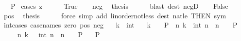 \begin{isabellebody}
\ \ \ P\isanewline
%
\isadelimproof
%
\endisadelimproof
%
\isatagproof
{}\isamarkupfalse%
\ {\isacharparenleft}{\kern0pt}cases\ {\isachardoublequoteopen}z\ {\isacharless}{\kern0pt}\ {}{\isachardoublequoteclose}{\isacharparenright}{\kern0pt}\isanewline
\ \ \isamarkupfalse%
\ True\isanewline
\ \ \isamarkupfalse%
\ neg\ \isamarkupfalse%
\ {\isacharquery}{\kern0pt}thesis\isanewline
\ \ \ \ \isamarkupfalse%
\ {\isacharparenleft}{\kern0pt}blast\ dest{\isacharbang}{\kern0pt}{\isacharcolon}{\kern0pt}\ negD{\isacharparenright}{\kern0pt}\isanewline
{}\isamarkupfalse%
\isanewline
\ \ \isamarkupfalse%
\ False\isanewline
\ \ \isamarkupfalse%
\ pos\ \isamarkupfalse%
\ {\isacharquery}{\kern0pt}thesis\isanewline
\ \ \ \ \isamarkupfalse%
\ {\isacharparenleft}{\kern0pt}force\ simp\ add{\isacharcolon}{\kern0pt}\ linorder{\isacharunderscore}{\kern0pt}not{\isacharunderscore}{\kern0pt}less\ dest{\isacharcolon}{\kern0pt}\ nat{\isacharunderscore}{\kern0pt}{}{\isacharunderscore}{\kern0pt}le\ {\isacharbrackleft}{\kern0pt}THEN\ sym{\isacharbrackright}{\kern0pt}{\isacharparenright}{\kern0pt}\isanewline
{}\isamarkupfalse%
%
\endisatagproof
{\isafoldproof}%
%
\isadelimproof
\isanewline
%
\endisadelimproof
\isanewline
{}\isamarkupfalse%
\ int{\isacharunderscore}{\kern0pt}cases{}\ {\isacharbrackleft}{\kern0pt}case{\isacharunderscore}{\kern0pt}names\ zero\ pos\ neg{\isacharbrackright}{\kern0pt}{\isacharcolon}{\kern0pt}\isanewline
\ \ \ k\ {\isacharcolon}{\kern0pt}{\isacharcolon}{\kern0pt}\ int\isanewline
\ \ \ {\isachardoublequoteopen}k\ {\isacharequal}{\kern0pt}\ {}\ {\isasymLongrightarrow}\ P{\isachardoublequoteclose}\ \ {\isachardoublequoteopen}{\isasymAnd}n{\isachardot}{\kern0pt}\ k\ {\isacharequal}{\kern0pt}\ int\ n\ {\isasymLongrightarrow}\ n\ {\isachargreater}{\kern0pt}\ {}\ {\isasymLongrightarrow}\ P{\isachardoublequoteclose}\isanewline
\ \ \ \ \ {\isachardoublequoteopen}{\isasymAnd}n{\isachardot}{\kern0pt}\ k\ {\isacharequal}{\kern0pt}\ {\isacharminus}{\kern0pt}\ int\ n\ {\isasymLongrightarrow}\ n\ {\isachargreater}{\kern0pt}\ {}\ {\isasymLongrightarrow}\ P{\isachardoublequoteclose}\isanewline
\ \ \ {\isachardoublequoteopen}P{\isachardoublequoteclose}\isanewline
%
\isadelimproof
%
\endisadelimproof
%
\isatagproof

\end{isabellebody}

